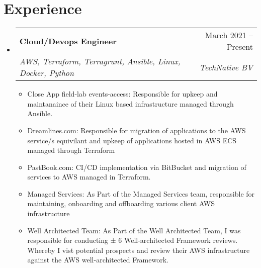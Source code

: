 \documentclass[letterpaper,11pt]{article}
\makeatletter
\newcommand{\resumeItem}[1]{
  \item\small{
    {#1 \vspace{-2pt}}
  }
}
\newcommand{\resumeSubheading}[4]{
  \vspace{-2pt}\item
    \begin{tabular*}{0.97\textwidth}[t]{l@{\extracolsep{\fill}}r}
      \textbf{#1} & #2 \\
      \textit{\small#3} & \textit{\small #4} \\
    \end{tabular*}\vspace{-7pt}
}
\newcommand{\resumeSubHeadingListStart}{\begin{itemize}[leftmargin=0.15in, label={}]}
\newcommand{\resumeSubHeadingListEnd}{\end{itemize}}
\newcommand{\resumeItemListStart}{\begin{itemize}}
\newcommand{\resumeItemListEnd}{\end{itemize}\vspace{-5pt}}
\makeatother
\begin{document}
\section{Experience}
  \resumeSubHeadingListStart

    \resumeSubheading
      {Cloud/Devops Engineer}{March 2021 -- Present}
      {AWS, Terraform, Terragrunt, Ansible, Linux, Docker, Python}{TechNative BV}
      \resumeItemListStart
        \resumeItem{Close App field-lab events-access: Responsible for upkeep and maintanaince of their Linux based infrastructure managed through Ansible.}{}
        \resumeItem{Dreamlines.com: Responsible for migration of applications to the AWS service/s equivilant and upkeep of applications hosted in AWS ECS managed through Terraform}
        \resumeItem{PastBook.com: CI/CD implementation via BitBucket and migration of services to AWS managed in Terraform.}
        \resumeItem{Managed Services: As Part of the Managed Services team, responsible for maintaining, onboarding and offboarding various client AWS infrastructure}
        \resumeItem{Well Architected Team: As Part of the Well Architected Team, I was responsible for conducting ± 6 Well-architected Framework reviews. Whereby I vist potential prospects and review their AWS infrastructure against the AWS well-architected Framework.}
      \resumeItemListEnd
  \resumeSubHeadingListEnd
\end{document}
